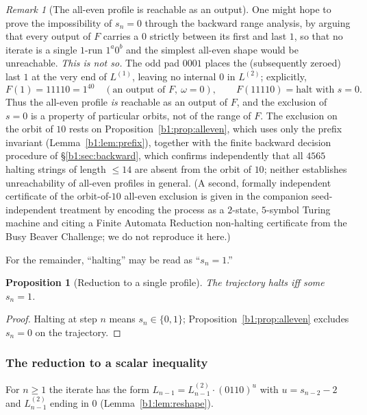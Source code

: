 \documentclass[a4paper]{article}
\theoremstyle{plain}
\newtheorem{proposition}{Proposition}[subsection]
\theoremstyle{definition}
\theoremstyle{remark}
\newtheorem{remark}{Remark}[subsection]
\begin{document}
\begin{remark}[The all-even profile is reachable as an output]\label{b1:rem:rem18}
One might hope to prove the impossibility of $s_n=0$ through the backward range analysis, by arguing that every output of $F$ carries a $0$ strictly between its first and last $1$, so that no iterate is a single $1$-run $1^a0^b$ and the simplest all-even shape would be unreachable. \emph{This is not so.} The odd pad $0001$ places the (subsequently zeroed) last $1$ at the very end of $L^{(1)}$, leaving no internal $0$ in $L^{(2)}$; explicitly,
\[ F(1)=11110=1^40\quad(\text{an output of }F,\ \omega=0),\qquad F(11110)=\text{halt with }s=0. \]
Thus the all-even profile \emph{is} reachable as an output of $F$, and the exclusion of $s=0$ is a property of particular orbits, not of the range of $F$. The exclusion on the orbit of $10$ rests on Proposition~\ref{b1:prop:alleven}, which uses only the prefix invariant (Lemma~\ref{b1:lem:prefix}), together with the finite backward decision procedure of \S\ref{b1:sec:backward}, which confirms independently that all $4565$ halting strings of length $\le 14$ are absent from the orbit of $10$; neither establishes unreachability of all-even profiles in general. (A second, formally independent certificate of the orbit-of-$10$ all-even exclusion is given in the companion seed-independent treatment by encoding the process as a $2$-state, $5$-symbol Turing machine and citing a Finite Automata Reduction non-halting certificate from the Busy Beaver Challenge; we do not reproduce it here.)
\end{remark}

For the remainder, ``halting'' may be read as ``$s_n=1$.''

\begin{proposition}[Reduction to a single profile]\label{b1:prop:single}
The trajectory halts iff some $s_n=1$.
\end{proposition}
\begin{proof}
Halting at step $n$ means $s_n\in\{0,1\}$; Proposition~\ref{b1:prop:alleven} excludes $s_n=0$ on the trajectory.
\end{proof}

\subsubsection{The reduction to a scalar inequality}\label{b1:sec:reduction}
For $n\ge 1$ the iterate has the form $L_{n-1}=L^{(2)}_{n-1}\cdot(0110)^u$ with $u=s_{n-2}-2$ and $L^{(2)}_{n-1}$ ending in $0$ (Lemma~\ref{b1:lem:reshape}).
\end{document}
